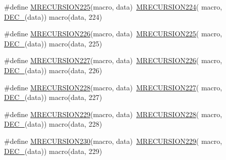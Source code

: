\begin{DoxyCompactItemize}
\item 
\#define \mbox{\hyperlink{group__group__sam0__utils__mrecursion_ga3affdcfd205e62f470e944888854dd5e}{M\+R\+E\+C\+U\+R\+S\+I\+O\+N225}}(macro,  data)~\mbox{\hyperlink{group__group__sam0__utils__mrecursion_ga5d2b86c40ce9218629a8c46d94f34206}{M\+R\+E\+C\+U\+R\+S\+I\+O\+N224}}(  macro, \mbox{\hyperlink{group__group__sam0__utils__mrecursion_ga1d23d683797679dca8c3512a54a5dcae}{D\+E\+C\+\_\+}}(data))   macro(data, 224)
\item 
\#define \mbox{\hyperlink{group__group__sam0__utils__mrecursion_ga98d3f68511230e8b1e541db7cd93f59d}{M\+R\+E\+C\+U\+R\+S\+I\+O\+N226}}(macro,  data)~\mbox{\hyperlink{group__group__sam0__utils__mrecursion_ga3affdcfd205e62f470e944888854dd5e}{M\+R\+E\+C\+U\+R\+S\+I\+O\+N225}}(  macro, \mbox{\hyperlink{group__group__sam0__utils__mrecursion_ga1d23d683797679dca8c3512a54a5dcae}{D\+E\+C\+\_\+}}(data))   macro(data, 225)
\item 
\#define \mbox{\hyperlink{group__group__sam0__utils__mrecursion_ga45b814bc93f1a82ae4f18566beedb453}{M\+R\+E\+C\+U\+R\+S\+I\+O\+N227}}(macro,  data)~\mbox{\hyperlink{group__group__sam0__utils__mrecursion_ga98d3f68511230e8b1e541db7cd93f59d}{M\+R\+E\+C\+U\+R\+S\+I\+O\+N226}}(  macro, \mbox{\hyperlink{group__group__sam0__utils__mrecursion_ga1d23d683797679dca8c3512a54a5dcae}{D\+E\+C\+\_\+}}(data))   macro(data, 226)
\item 
\#define \mbox{\hyperlink{group__group__sam0__utils__mrecursion_ga47235a08705017eeeaef3b229f9c92db}{M\+R\+E\+C\+U\+R\+S\+I\+O\+N228}}(macro,  data)~\mbox{\hyperlink{group__group__sam0__utils__mrecursion_ga45b814bc93f1a82ae4f18566beedb453}{M\+R\+E\+C\+U\+R\+S\+I\+O\+N227}}(  macro, \mbox{\hyperlink{group__group__sam0__utils__mrecursion_ga1d23d683797679dca8c3512a54a5dcae}{D\+E\+C\+\_\+}}(data))   macro(data, 227)
\item 
\#define \mbox{\hyperlink{group__group__sam0__utils__mrecursion_gaec897a7f62aa5fef50018148adf089bb}{M\+R\+E\+C\+U\+R\+S\+I\+O\+N229}}(macro,  data)~\mbox{\hyperlink{group__group__sam0__utils__mrecursion_ga47235a08705017eeeaef3b229f9c92db}{M\+R\+E\+C\+U\+R\+S\+I\+O\+N228}}(  macro, \mbox{\hyperlink{group__group__sam0__utils__mrecursion_ga1d23d683797679dca8c3512a54a5dcae}{D\+E\+C\+\_\+}}(data))   macro(data, 228)
\item 
\#define \mbox{\hyperlink{group__group__sam0__utils__mrecursion_ga4eeac3211fea63e6fe6eb6b32b6fbc89}{M\+R\+E\+C\+U\+R\+S\+I\+O\+N230}}(macro,  data)~\mbox{\hyperlink{group__group__sam0__utils__mrecursion_gaec897a7f62aa5fef50018148adf089bb}{M\+R\+E\+C\+U\+R\+S\+I\+O\+N229}}(  macro, \mbox{\hyperlink{group__group__sam0__utils__mrecursion_ga1d23d683797679dca8c3512a54a5dcae}{D\+E\+C\+\_\+}}(data))   macro(data, 229)

\end{DoxyCompactItemize}

